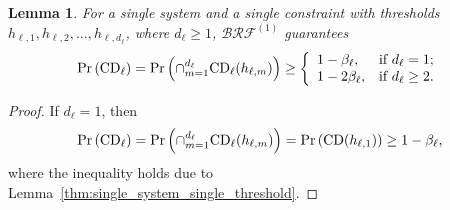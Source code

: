 \documentclass[11pt]{article}
\newtheorem{lemma}{Lemma}
\begin{document}
\begin{lemma} 
\label{thm:single_system_multiple_threshold}
For a single system and a single constraint with thresholds $h_{\ell,1},h_{\ell,2},\ldots,h_{\ell, d_\ell}$, where $d_\ell\geq 1$, $\mathcal{BRF}^{(1)}$ guarantees 
\[
\Pr\left( {\rm CD}_\ell \right) = \Pr\left( \cap_{m=1}^{d_\ell}{\rm CD}_\ell(h_{\ell, m}) \right)  \ge \left\{ \begin{array}{ll} 
1 - \beta_\ell, & \mbox{if } d_\ell=1; \\
1 - 2\beta_\ell, & \mbox{if } d_\ell\ge 2.
\end{array} \right.
\]
\end{lemma}

\begin{proof}
    \renewcommand{\qedsymbol}{}
    If $d_\ell=1$, then 
\[
\Pr\left( {\rm CD}_\ell \right) = \Pr\left( \cap_{m=1}^{d_\ell}{\rm CD}_{\ell}(h_{\ell, m}) \right)  = \Pr\left( {\rm CD}(h_{\ell, 1}) \right) \ge 1 - \beta_\ell,
\]
where the inequality holds due to Lemma~\ref{thm:single_system_single_threshold}.


\end{proof}
\end{document}
